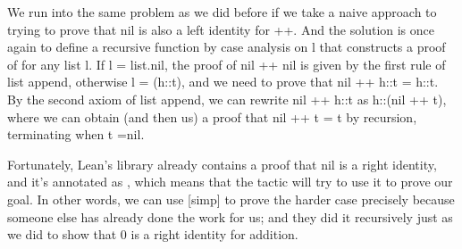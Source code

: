 \documentclass[letterpaper,10pt,english]{sphinxmanual}
\begin{document}
\sphinxAtStartPar
We run into the same problem as we did before if we take a
naive approach to trying to prove that nil is also a left
identity for ++. And the solution is once again to define
a recursive function by case analysis on l that constructs
a proof of  for any list l. If l = list.nil,
the proof of nil ++ nil is given by the first rule of list
append, otherwise l = (h::t), and we need to prove that
nil ++ h::t = h::t. By the second axiom of list append,
we can rewrite nil ++ h::t as h::(nil ++ t), where we can
obtain (and then us) a proof that nil ++ t = t by recursion,
terminating when t =nil.

\sphinxAtStartPar
Fortunately, Lean’s library already contains a proof that
nil is a right identity, and it’s annotated as \sphinxstyleemphasis{{[}simp{]}},
which means that the  tactic will try to use it to
prove our goal. In other words, we can use {[}simp{]} to prove
the harder case precisely because someone else has already
done the work for us; and they did it recursively just as
we did to show that 0 is a right identity for addition.

\begin{sphinxVerbatim}[commandchars=\\\{\}]
     
         \PYG{o}{[}\PYG{o}{]}   
 
 
 \PYG{o}{[}\PYG{o}{]}

          
            
            
\end{sphinxVerbatim}
\end{document}
